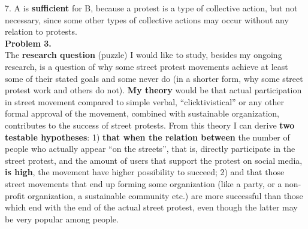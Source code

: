 \documentclass{article}
\begin{document}
7.	A is \textbf{sufficient} for B, because a protest is a type of collective action, but not necessary,  since some other types of collective actions may occur without any relation to protests.  
\\

\textbf{Problem 3.}
\\

The \textbf{research question} (puzzle) I would like to study, besides my ongoing research, is a question of why some street protest movements achieve at least some of their stated goals and some never do (in a shorter form, why some street protest work and others do not). \textbf{My theory} would be that actual participation in street movement compared to simple verbal, “clicktivistical” or any other formal approval of the movement, combined with sustainable organization, contributes to the success of street protests. From this theory I can derive \textbf{two testable hypotheses}: 1) \textbf{that when the relation between} the number of people who actually appear “on the streets”, that is, directly participate in the street protest, and the amount of users that support the protest on social media, \textbf{is high}, the movement have higher possibility to succeed; 2) and that those street movements that end up forming some organization (like a party, or a non-profit organization, a sustainable community etc.) are more successful than those which end with the end of the actual street protest, even though the latter may be very popular among people. 
\end{document}
